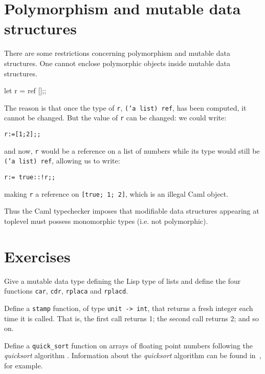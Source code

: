 \section{Polymorphism and mutable data structures}

There are some restrictions concerning polymorphism and mutable data
structures.
One cannot enclose polymorphic objects inside mutable data structures.
\begin{caml_example}
let r = ref [];;
\end{caml_example}
The reason is that once the type of {\tt r}, {\tt ('a list) ref}, has
been computed, it cannot be changed. But the value of {\tt r} can be
changed: we could write:
\begin{verbatim}
r:=[1;2];;
\end{verbatim}
and now, {\tt r} would be a reference on a list of numbers while its type
would still be {\tt ('a list) ref}, allowing us to write:
\begin{verbatim}
r:= true::!r;;
\end{verbatim}
making {\tt r} a reference on {\tt [true; 1; 2]}, which is an illegal
Caml object.

Thus the Caml typechecker imposes that modifiable data structures appearing
at toplevel must possess monomorphic types (i.e. not polymorphic).



\section*{Exercises}

\begin{exo}\label{Annot:4}
Give a mutable data type defining the Lisp type of lists and define
the four functions {\tt car}, {\tt cdr}, {\tt rplaca} and {\tt rplacd}.
\end{exo}

\begin{exo}\label{Annot:5}
Define a \verb"stamp" function, of type \verb"unit -> int", that
returns a fresh integer each time it is called. That is, the first
call returns 1; the second call returns 2; and so on.
\end{exo}

\begin{exo}\label{Annot:6}
Define a \verb|quick_sort| function on arrays of floating point
numbers following the {\em quicksort} algorithm \cite{Quicksort}.
Information about the {\em quicksort} algorithm can be found
in~\cite{SedgewickPascal}, for example.
\end{exo}
